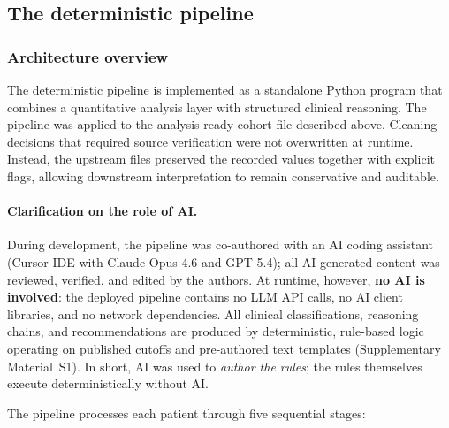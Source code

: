 \documentclass[11pt,a4paper]{article}
\begin{document}
\subsection{The deterministic pipeline}

\subsubsection{Architecture overview}

The deterministic pipeline is implemented as a standalone Python program that combines a quantitative analysis layer with structured clinical reasoning. The pipeline was applied to the analysis-ready cohort file described above. Cleaning decisions that required source verification were not overwritten at runtime. Instead, the upstream files preserved the recorded values together with explicit flags, allowing downstream interpretation to remain conservative and auditable.

\paragraph{Clarification on the role of AI.}
During development, the pipeline was co-authored with an AI coding assistant (Cursor IDE with Claude Opus 4.6 and GPT-5.4); all AI-generated content was reviewed, verified, and edited by the authors. At runtime, however, \textbf{no AI is involved}: the deployed pipeline contains no LLM API calls, no AI client libraries, and no network dependencies. All clinical classifications, reasoning chains, and recommendations are produced by deterministic, rule-based logic operating on published cutoffs and pre-authored text templates (Supplementary Material~S1). In short, AI was used to \textit{author the rules}; the rules themselves execute deterministically without AI.

The pipeline processes each patient through five sequential stages:
\end{document}
